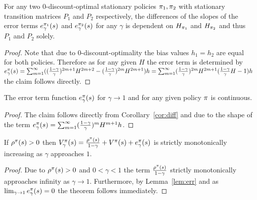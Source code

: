 \documentclass[envcountsame]{llncs}
\begin{document}
\begin{corollary}
  \label{cor:diff}
  For any two \(0\)-discount-optimal stationary policies $\pi_{1}, \pi_{2}$ with stationary
  transition matrices \(P_{1}\) and \(P_{2}\) respectively, the differences of the slopes of the
  error terms \(e_{\gamma}^{\pi_{1}}(s)\) and \(e_{\gamma}^{\pi_{2}}(s)\) for any \(\gamma\) is
  dependent on \(H_{\pi_{1}}\) and \(H_{\pi_{2}}\) and thus \(P_{1}\) and \(P_{2}\) solely.
\end{corollary}

\begin{proof}
  Note that due to \(0\)-discount-optimality the bias values \(h_{1} = h_{2}\) are equal for both
  policies. Therefore as for any given \(H\) the error term is determined by
  \(e_{\gamma}^{\pi}(s) = \sum_{m=1}^{\infty} ((\frac{1-\gamma}{\gamma})^{2m + 1} H^{2m+2} -
  (\frac{1-\gamma}{\gamma})^{2m} H^{2m+1}) h = \sum_{m=1}^{\infty} (\frac{1-\gamma}{\gamma})^{2m}
  H^{2m+1}( \frac{1-\gamma}{\gamma} H - 1) h \) the claim follows directly.
\end{proof}

\begin{corollary}
  \label{cor:cont}
  The error term function \(e_{\gamma}^{\pi}(s)\) for \(\gamma \to 1\) and for any given policy
  \(\pi\) is continuous.
\end{corollary}

\begin{proof}
  The claim follows directly from Corollary~\ref{cor:diff} and due to the shape of the term
  \(e_{\gamma}^{\pi}(s) = \sum_{m=1}^{\infty} (\frac{1-\gamma}{\gamma})^{m} H^{m+1} h\).
\end{proof}


\begin{theorem}
  If \(\rho^{\pi}(s) > 0\) then
  \(V_{\gamma}^{\pi}(s) = \frac{\rho^{\pi}(s)}{1-\gamma} + V^{\pi}(s) + e_{\gamma}^{\pi}(s)\) is
  strictly monotonically increasing as $\gamma$ approaches \(1\).
\end{theorem}

\begin{proof}
  Due to \(\rho^{\pi}(s) > 0\) and \(0 < \gamma < 1\) the term
  \(\frac{\rho^{\pi}(s)}{1-\gamma}\) strictly monotonically approaches infinity as
  $\gamma \to 1$. Furthermore, by Lemma~\ref{lem:err} and as
  \(\lim_{\gamma \to 1} e_{\gamma}^{\pi}(s) = 0\) the theorem follows immediately.
\end{proof}
\end{document}
